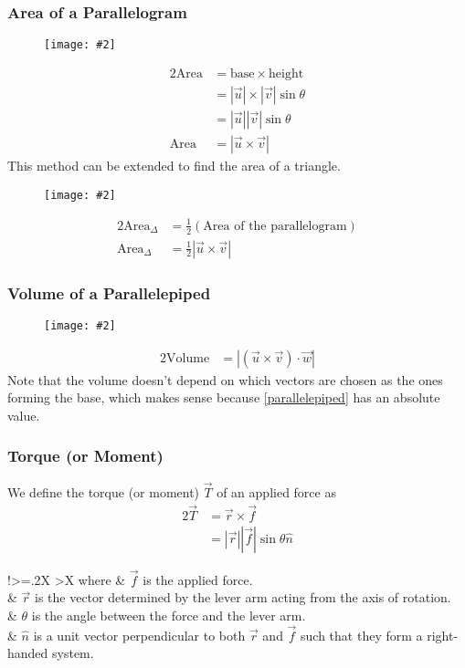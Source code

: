 \documentclass{report}
\newcommand{\diagram}[2][0.5]{
	\begin{figure}[H]
		\centering
		\texttt{[image: \#2]}
	\end{figure}
	}
\theoremstyle{definition}
\numberwithin{equation}{section}
\begin{document}
\subsubsection*{Area of a Parallelogram}
\diagram{parallelogram}
\begin{alignat}{2}
	\mathrm{Area} &= \mathrm{base} \times \mathrm{height} \nonumber \\
								&= |\vec u| \times |\vec v| \sin \theta \nonumber \\
								&= |\vec u| |\vec v| \sin \theta \nonumber \\
	\mathrm{Area} &= |\vec u \times \vec v|
\end{alignat}
This method can be extended to find the area of a triangle.
\diagram{triangle}
\begin{alignat}{2}
	\mathrm{Area}_\Delta &= \frac{1}{2}(\textrm{Area of the parallelogram}) \nonumber \\
	\mathrm{Area}_\Delta &= \frac{1}{2} \left|\vec u \times \vec v\right|
\end{alignat}

\subsubsection*{Volume of a Parallelepiped}
\diagram{parallelepiped}
\begin{alignat}{2}
	\mathrm{Volume} &= \left|(\vec u \times \vec v) \cdot \vec w\right|
	\label{parallelepiped}
\end{alignat}
Note that the volume doesn't depend on which vectors are chosen as the ones forming the base, which makes sense because \eqref{parallelepiped} has an absolute value.

\subsubsection*{Torque (or Moment)}
We define the torque (or moment) $\vec T$ of an applied force as
\begin{alignat}{2}
	\vec T &= \vec r \times \vec f \\
				 &= |\vec r||\vec f| \sin \theta \hat n
\end{alignat}
\begin{tabularx}{\textwidth}{!{\extracolsep{\fill}}>{\hsize=.2\hsize}X >{\hsize}X}
	where & $\vec f$ is the applied force. \\
				& $\vec r$ is the vector determined by the lever arm acting from the axis of rotation. \\
				& $\theta$ is the angle between the force and the lever arm. \\
				& $\hat n$ is a unit vector perpendicular to both $\vec r$ and $\vec f$ such that they form a right-handed system.
\end{tabularx}
\end{document}

